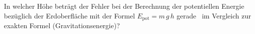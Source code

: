 In welcher Höhe beträgt der Fehler bei der Berechnung der potentiellen Energie bezüglich der Erdoberfläche mit der Formel $E_\mathrm{pot} = m\,g\,h$ gerade \pFeO\ im Vergleich zur exakten Formel (Gravitationsenergie)?
